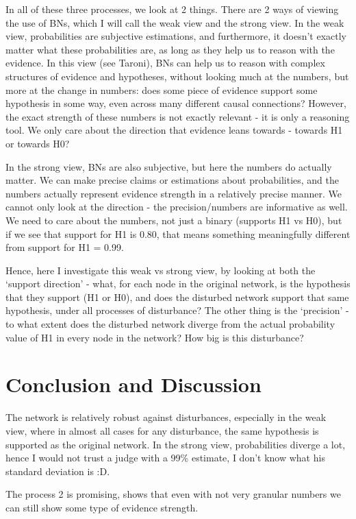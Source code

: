 \documentclass[11pt]{amsart}
\begin{document}
In all of these three processes, we look at 2 things. There are 2 ways of viewing the use of BNs, which I will call the weak view and the strong view. In the weak view, probabilities are subjective estimations, and furthermore, it doesn't exactly matter what these probabilities are, as long as they help us to reason with the evidence. In this view (see Taroni), BNs can help us to reason with complex structures of evidence and hypotheses, without looking much at the numbers, but more at the change in numbers: does some piece of evidence support some hypothesis in some way, even across many different causal connections? However, the exact strength of these numbers is not exactly relevant - it is only a reasoning tool. We only care about the direction that evidence leans towards - towards H1 or towards H0?

In the strong view, BNs are also subjective, but here the numbers do actually matter. We can make precise claims or estimations about probabilities, and the numbers actually represent evidence strength in a relatively precise manner. We cannot only look at the direction - the precision/numbers are informative as well. We need to care about the numbers, not just a binary (supports H1 vs H0), but if we see that support for H1 is 0.80, that means something meaningfully different from support for H1 = 0.99.

Hence, here I investigate this weak vs strong view, by looking at both the `support direction' - what, for each node in the original network, is the hypothesis that they support (H1 or H0), and does the disturbed network support that same hypothesis, under all processes of disturbance?
The other thing is the `precision' - to what extent does the disturbed network diverge from the actual probability value of H1 in every node in the network? How big is this disturbance?

\section{Conclusion and Discussion}

The network is relatively robust against disturbances, especially in the weak view, where in almost all cases for any disturbance, the same hypothesis is supported as the original network. In the strong view, probabilities diverge a lot, hence I would not trust a judge with a 99\% estimate, I don't know what his standard deviation is :D.

The process 2 is promising, shows that even with not very granular numbers we can still show some type of evidence strength. 
\end{document}
